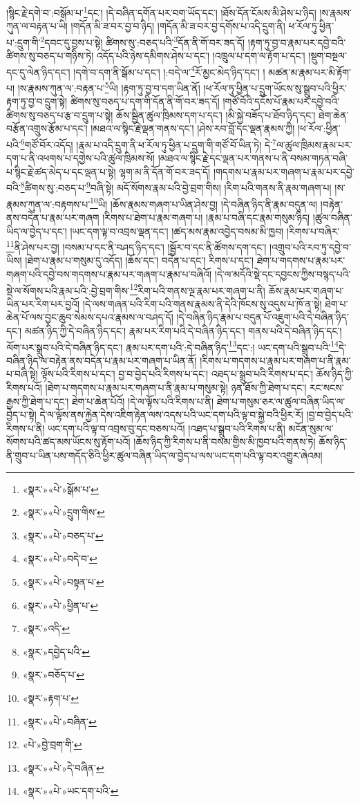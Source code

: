།སྙིང་རྗེ་དགེ་བ་:བསྒོམ་པ་\footnote{«སྣར་»«པེ་»སྒོམ་པ་}དང་། །དེ་བཞིན་དགོན་པར་བག་ཡོད་དང་། །ཐོས་དོན་ངོམས་མི་ཤེས་པ་ཉིད། །ས་རྣམས་ཀུན་ལ་བརྟན་པ་ཡི། །གདོན་མི་ཟ་བར་བྱ་བ་ཉིད། །གདོན་མི་ཟ་བར་བྱ་དགོས་པ་འདི་དྲུག་ནི། ཕ་རོལ་ཏུ་ཕྱིན་པ་:དྲུག་གི་\footnote{«སྣར་»«པེ་»དྲུག་གིས་}དབང་དུ་བྱས་པ་སྟེ། ཚིགས་སུ་:བཅད་པའི་\footnote{«སྣར་»«པེ་»བཅད་པ་}དོན་ནི་གོ་བར་ཟད་དོ། །རྟག་ཏུ་བྱ་བ་རྣམ་པར་དབྱེ་བའི་ཚིགས་སུ་བཅད་པ་གཉིས་ཏེ། འདོད་པའི་ཉེས་དམིགས་ཤེས་པ་དང་། །འཁྲུལ་པ་དག་ལ་རྟོག་པ་དང་། །སྡུག་བསྔལ་དང་དུ་ལེན་ཉིད་དང་། །དགེ་བ་དག་ནི་སྒོམ་པ་དང་། །:བདེ་ལ་\footnote{«སྣར་»«པེ་»བདེ་བ་}རོ་མྱང་མེད་ཉིད་དང་། །
མཚན་མ་རྣམ་པར་མི་རྟོག་པ། །ས་རྣམས་ཀུན་ལ་:བརྟན་པ་\footnote{«སྣར་»«པེ་»བསྟན་པ་}ཡི། །རྟག་ཏུ་བྱ་བ་དག་ཡིན་ནོ། །ཕ་རོལ་ཏུ་ཕྱིན་པ་དྲུག་ཡོངས་སུ་སྒྲུབ་པའི་ཕྱིར་རྟག་ཏུ་བྱ་བ་དྲུག་སྟེ། ཚིགས་སུ་བཅད་པ་དག་གི་དོན་ནི་གོ་བར་ཟད་དོ། །གཙོ་བོའི་དངོས་པོ་རྣམ་པར་དབྱེ་བའི་ཚིགས་སུ་བཅད་པ་རྩ་བ་དྲུག་པ་སྟེ། ཆོས་སྦྱིན་ཚུལ་ཁྲིམས་དག་པ་དང་། །མི་སྐྱེ་བཟོད་པ་ཐོབ་ཉིད་དང་། ཐེག་ཆེན་བརྩོན་འགྲུས་རྩོམ་པ་དང་། །མཐའ་ལ་སྙིང་རྗེ་ལྡན་གནས་དང་། །ཤེས་རབ་བློ་དང་ལྡན་རྣམས་ཀྱི། །ཕ་རོལ་:ཕྱིན་པའི་\footnote{«སྣར་»«པེ་»ཕྱིན་པ་}གཙོ་བོར་འདོད། །རྣམ་པ་འདི་དྲུག་ནི་ཕ་རོལ་ཏུ་ཕྱིན་པ་དྲུག་གི་གཙོ་བོ་ཡིན་ཏེ། དེ་\footnote{«སྣར་»འདི་}ལ་ཚུལ་ཁྲིམས་རྣམ་པར་དག་པ་ནི་འཕགས་པ་དགྱེས་པའི་ཚུལ་ཁྲིམས་སོ། །མཐའ་ལ་སྙིང་རྗེ་དང་ལྡན་པར་གནས་པ་ནི་བསམ་གཏན་བཞི་པ་སྙིང་རྗེ་ཚད་མེད་པ་དང་ལྡན་པ་སྟེ། ལྷག་མ་ནི་དོན་གོ་བར་ཟད་དོ། །གདགས་པ་རྣམ་པར་གཞག་པ་རྣམ་པར་དབྱེ་བའི་\footnote{«སྣར་»དབྱེད་པའི་}ཚིགས་སུ་:བཅད་པ་\footnote{«སྣར་»བཅོད་པ་}བཞི་སྟེ། མདོ་སོགས་རྣམ་པའི་བྱེ་བྲག་གིས། །རིག་པའི་གནས་ནི་རྣམ་གཞག་པ། །ས་རྣམས་ཀུན་ལ་:བརྟགས་པ་\footnote{«སྣར་»རྟག་པ་}ཡི། །ཆོས་རྣམས་གཞག་པ་ཡིན་ཤེས་བྱ། །དེ་བཞིན་ཉིད་ནི་རྣམ་བདུན་ལ། །བརྟེན་ནས་བདེན་པ་རྣམ་པར་གཞག །རིགས་པ་ཐེག་པ་རྣམ་གཞག་པ། །རྣམ་པ་བཞི་དང་རྣམ་གསུམ་ཉིད། །ཚུལ་བཞིན་ཡིད་ལ་བྱེད་པ་དང་། །ཡང་དག་ལྟ་བ་འབྲས་ལྡན་དང་། །ཚད་མས་རྣམ་འབྱེད་བསམ་མི་ཁྱབ། །རིགས་པ་བཞིར་\footnote{«སྣར་»«པེ་»བཞིན་}ནི་ཤེས་པར་བྱ། །བསམ་པ་དང་ནི་བཤད་ཉིད་དང་། །སྦྱོར་བ་དང་ནི་ཚོགས་དག་དང་། །འགྲུབ་པའི་རབ་ཏུ་དབྱེ་བ་ཡིས། །ཐེག་པ་རྣམ་པ་གསུམ་དུ་འདོད། །ཆོས་དང་། བདེན་པ་དང་། རིགས་པ་དང་། ཐེག་པ་གདགས་པ་རྣམ་པར་གཞག་པའི་དབྱེ་བས་གདགས་པ་རྣམ་པར་གཞག་པ་རྣམ་པ་བཞིའོ། །དེ་ལ་མདོའི་སྡེ་དང་དབྱངས་ཀྱིས་བསྙད་པའི་སྡེ་ལ་སོགས་པའི་རྣམ་པའི་:བྱེ་བྲག་གིས་\footnote{«པེ་»བྱེ་བྲག་གི་}རིག་པའི་གནས་ལྔ་རྣམ་པར་གཞག་པ་ནི། ཆོས་རྣམ་པར་གཞག་པ་ཡིན་པར་རིག་པར་བྱའོ། །དེ་ལས་གཞན་པའི་རིག་པའི་གནས་རྣམས་ནི་དེའི་ཁོངས་སུ་འདུས་པ་ཁོ་ན་སྟེ། ཐེག་པ་ཆེན་པོ་ལས་བྱང་ཆུབ་སེམས་དཔའ་རྣམས་ལ་བཤད་དོ། །དེ་བཞིན་ཉིད་རྣམ་པ་བདུན་པོ་འཇུག་པའི་དེ་བཞིན་ཉིད་དང་། མཚན་ཉིད་ཀྱི་དེ་བཞིན་ཉིད་དང་། རྣམ་པར་རིག་པའི་དེ་བཞིན་ཉིད་དང་། གནས་པའི་དེ་བཞིན་ཉིད་དང་། ལོག་པར་སྒྲུབ་པའི་དེ་བཞིན་ཉིད་དང་། རྣམ་པར་དག་པའི་:དེ་བཞིན་ཉིད་\footnote{«སྣར་»«པེ་»དེ་བཞིན་}དང་:། ཡང་དག་པའི་སྒྲུབ་པའི་\footnote{«སྣར་»«པེ་»ཡང་དག་པའི་}དེ་བཞིན་ཉིད་ལ་བརྟེན་ནས་བདེན་པ་རྣམ་པར་གཞག་པ་ཡིན་ནོ། །རིགས་པ་གདགས་པ་རྣམ་པར་གཞག་པ་ནི་རྣམ་པ་བཞི་སྟེ། ལྟོས་པའི་རིགས་པ་དང་། བྱ་བ་བྱེད་པའི་རིགས་པ་དང་། འཐད་པ་སྒྲུབ་པའི་རིགས་པ་དང་། ཆོས་ཉིད་ཀྱི་རིགས་པའོ། །ཐེག་པ་གདགས་པ་རྣམ་པར་གཞག་པ་ནི་རྣམ་པ་གསུམ་སྟེ། ཉན་ཐོས་ཀྱི་ཐེག་པ་དང་། རང་སངས་རྒྱས་ཀྱི་ཐེག་པ་དང་། ཐེག་པ་ཆེན་པོའོ། །དེ་ལ་ལྟོས་པའི་རིགས་པ་ནི། ཐེག་པ་གསུམ་ཅར་ལ་ཚུལ་བཞིན་ཡིད་ལ་བྱེད་པ་སྟེ། དེ་ལ་ལྟོས་ནས་རྐྱེན་དེས་འཇིག་རྟེན་ལས་འདས་པའི་ཡང་དག་པའི་ལྟ་བ་སྐྱེ་བའི་ཕྱིར་རོ། །བྱ་བ་བྱེད་པའི་རིགས་པ་ནི། ཡང་དག་པའི་ལྟ་བ་འབྲས་བུ་དང་བཅས་པའོ། །འཐད་པ་སྒྲུབ་པའི་རིགས་པ་ནི། མངོན་སུམ་ལ་སོགས་པའི་ཚད་མས་ཡོངས་སུ་རྟོག་པའོ། །ཆོས་ཉིད་ཀྱི་རིགས་པ་ནི་བསམ་གྱིས་མི་ཁྱབ་པའི་གནས་ཏེ། ཆོས་ཉིད་ནི་གྲུབ་པ་ཡིན་པས་གདོད་ཅིའི་ཕྱིར་ཚུལ་བཞིན་ཡིད་ལ་བྱེད་པ་ལས་ཡང་དག་པའི་ལྟ་བར་འགྱུར་ཞེའམ། 